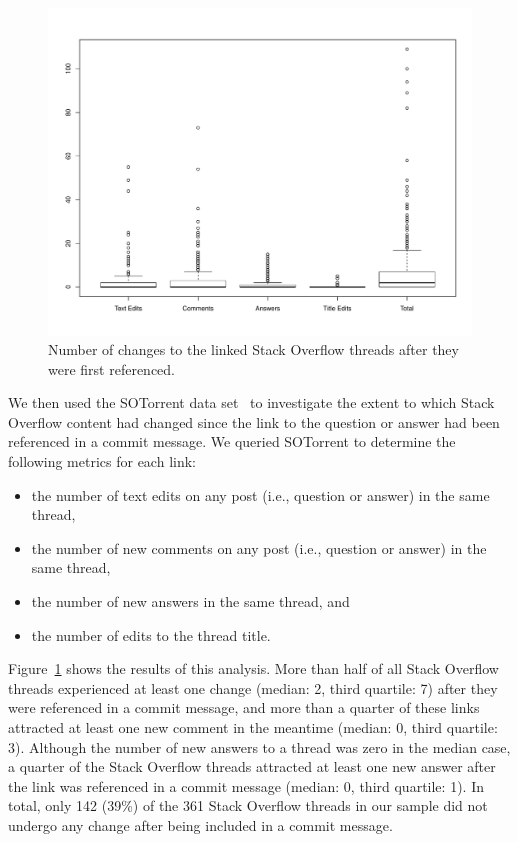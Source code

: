 \documentclass[smallextended]{svjour3}       %
\begin{document}
\begin{figure}[t]
\centering
\includegraphics[width=\linewidth]{so-case.pdf}
\caption{Number of changes to the linked Stack Overflow threads after they were first referenced.}
\label{fig:so-case}
\end{figure}

We then used the SOTorrent data set~\citep{baltes2018sotorrent} to investigate the extent to which Stack Overflow content had changed since the link to the question or answer had been referenced in a commit message. We queried SOTorrent to determine the following metrics for each link:
\begin{itemize}
    \item the number of text edits on any post (i.e., question or answer) in the same thread,
    \item the number of new comments on any post (i.e., question or answer) in the same thread,
    \item the number of new answers in the same thread, and
    \item the number of edits to the thread title.
\end{itemize}

Figure~\ref{fig:so-case} shows the results of this analysis. More than half of all Stack Overflow threads experienced at least one change (median: 2, third quartile: 7) after they were referenced in a commit message, and more than a quarter of these links attracted at least one new comment in the meantime (median: 0, third quartile: 3). Although the number of new answers to a thread was zero in the median case, a quarter of the Stack Overflow threads attracted at least one new answer after the link was referenced in a commit message (median: 0, third quartile: 1). In total, only 142 (39\%) of the 361 Stack Overflow threads in our sample did not undergo any change after being included in a commit message.
\end{document}
